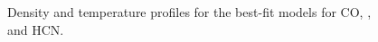

\begin{figure}[htp]
  \centering
    \hspace*{\fill}%
    \vfill%
    \vfill%
    \hspace*{\fill}%
    \caption{Density and temperature profiles for the best-fit models for CO, \hco, and HCN.}
    \label{fig:bf_disk_strs}
\end{figure}





